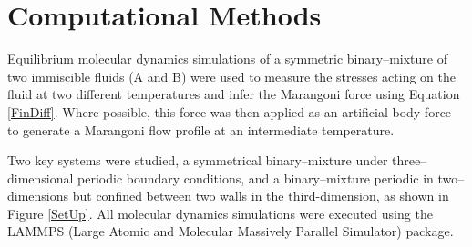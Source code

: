 \section{Computational Methods}

Equilibrium molecular dynamics simulations of a symmetric binary--mixture of two immiscible fluids (A and B) were used to measure the stresses acting on the fluid at two different temperatures and infer the Marangoni force using Equation \ref{FinDiff}.
Where possible, this force was then applied as an artificial body force to generate a Marangoni flow profile at an intermediate temperature.

Two key systems were studied, a symmetrical binary–mixture under three--dimensional periodic boundary conditions, and a binary--mixture periodic in two--dimensions but confined between two walls in the third-dimension, as shown in Figure \ref{SetUp}.
All molecular dynamics simulations were executed using the LAMMPS (Large Atomic and Molecular Massively Parallel Simulator) package.\cite{LAMMPS}  

